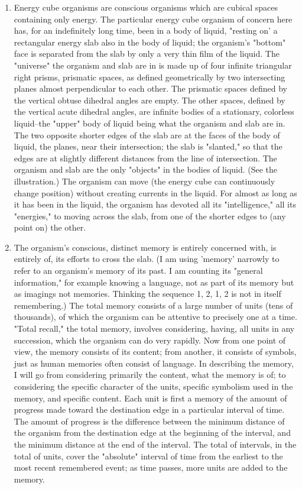 \documentclass[10pt,twoside,draft]{memoir}
\begin{document}
{{\begin{enumerate}
\item Energy cube organisms are conscious organisms which are cubical 
spaces containing only energy. The particular energy cube organism of 
concern here has, for an indefinitely long time, been in a body of liquid, 
"resting on' a rectangular energy slab also in the body of liquid; the 
organism's "bottom" face is separated from the slab by only a very thin film 
of the liquid. The "universe" the organism and slab are in is made up of four 
infinite triangular right prisms, prismatic spaces, as defined geometrically by 
two intersecting planes almost perpendicular to each other. The prismatic 
spaces defined by the vertical obtuse dihedral angles are empty. The other 
spaces, defined by the vertical acute dihedral angles, are infinite bodies of a 
stationary, colorless liquid--the "upper" body of liquid being what the 
organism and slab are in. The two opposite shorter edges of the slab are at 
the faces of the body of liquid, the planes, near their intersection; the slab is 
"slanted," so that the edges are at slightly different distances from the line 
of intersection. The organism and slab are the only "objects" in the bodies 
of liquid. (See the illustration.) The organism can move (the energy cube can 
continuously change position) without creating currents in the liquid. For 
almost as long as it has been in the liquid, the organism has devoted all its 
"intelligence," all its "energies," to moving across the slab, from one of the 
shorter edges to (any point on) the other. 

\item The organism's conscious, distinct memory is entirely concerned 
with, is entirely of, its efforts to cross the slab. (I am using 'memory' 
narrowly to refer to an organism's memory of its past. I am counting its 
"general information," for example knowing a language, not as part of its 
memory but as imagings not memories. Thinking the sequence 1, 2, 1, 2 is 
not in itself remembering.) The total memory consists of a large number of 
units (tens of thousands), of which the organism can be attentive to precisely 
one at a time. "Total recall," the total memory, involves considering, having, 
all units in any succession, which the organism can do very rapidly. Now 
from one point of view, the memory consists of its content; from another, it 
consists of symbols, just as human memories often consist of language. In 
describing the memory, I will go from considering primarily the content, 
what the memory is of; to considering the specific character of the units, 
specific symbolism used in the memory, and specific content. Each unit is 
first a memory of the amount of progress made toward the destination edge 
in a particular interval of time. The amount of progress is the difference 
between the minimum distance of the organism from the destination edge at 
the beginning of the interval, and the minimum distance at the end of the 
interval. The total of intervals, in the total of units, cover the "absolute" 
interval of time from the earliest to the most recent remembered event; as 
time passes, more units are added to the memory. 


\end{enumerate}}}
\end{document}
